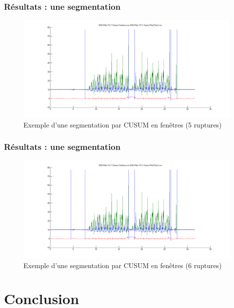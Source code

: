 \documentclass{beamer}
\begin{document}
\begin{frame}
	\frametitle{Résultats : une segmentation}
	\begin{figure}
		\includegraphics[scale=0.3]{seg5_win.png}
		\caption{Exemple d'une segmentation par CUSUM en fenêtres (5 ruptures)}
	\end{figure}
\end{frame}

\begin{frame}
	\frametitle{Résultats : une segmentation}
	\begin{figure}
		\includegraphics[scale=0.3]{seg6_win.png}
		\caption{Exemple d'une segmentation par CUSUM en fenêtres (6 ruptures)}
	\end{figure}
\end{frame}


\section{Conclusion}
\end{document}
